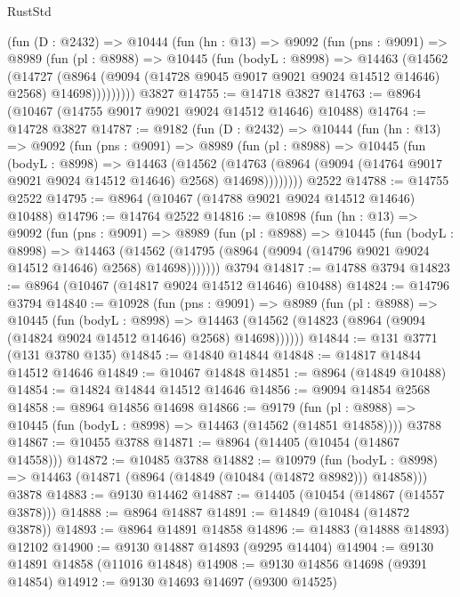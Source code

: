 \begin{lexlean}{RustStd}
\begin{coremodule}
      (fun (D : @2432) =>
      @10444
        (fun (hn : @13) =>
        @9092
          (fun (pns : @9091) =>
          @8989
            (fun (pl : @8988) =>
            @10445
              (fun (bodyL : @8998) =>
              @14463
                (@14562
                  (@14727
                    (@8964
                      (@9094 (@14728 @9045 @9017 @9021 @9024 @14512 @14646) @2568)
                      @14698)))))))))
    @3827
@14755 := @14718 @3827
@14763 := @8964 (@10467 (@14755 @9017 @9021 @9024 @14512 @14646) @10488)
@14764 := @14728 @3827
@14787 := @9182
    (fun (D : @2432) =>
    @10444
      (fun (hn : @13) =>
      @9092
        (fun (pns : @9091) =>
        @8989
          (fun (pl : @8988) =>
          @10445
            (fun (bodyL : @8998) =>
            @14463
              (@14562
                (@14763 (@8964 (@9094 (@14764 @9017 @9021 @9024 @14512 @14646) @2568) @14698))))))))
    @2522
@14788 := @14755 @2522
@14795 := @8964 (@10467 (@14788 @9021 @9024 @14512 @14646) @10488)
@14796 := @14764 @2522
@14816 := @10898
    (fun (hn : @13) =>
    @9092
      (fun (pns : @9091) =>
      @8989
        (fun (pl : @8988) =>
        @10445
          (fun (bodyL : @8998) =>
          @14463
            (@14562 (@14795 (@8964 (@9094 (@14796 @9021 @9024 @14512 @14646) @2568) @14698)))))))
    @3794
@14817 := @14788 @3794
@14823 := @8964 (@10467 (@14817 @9024 @14512 @14646) @10488)
@14824 := @14796 @3794
@14840 := @10928
    (fun (pns : @9091) =>
    @8989
      (fun (pl : @8988) =>
      @10445
        (fun (bodyL : @8998) =>
        @14463 (@14562 (@14823 (@8964 (@9094 (@14824 @9024 @14512 @14646) @2568) @14698))))))
@14844 := @131 @3771 (@131 @3780 @135)
@14845 := @14840 @14844
@14848 := @14817 @14844 @14512 @14646
@14849 := @10467 @14848
@14851 := @8964 (@14849 @10488)
@14854 := @14824 @14844 @14512 @14646
@14856 := @9094 @14854 @2568
@14858 := @8964 @14856 @14698
@14866 := @9179
    (fun (pl : @8988) => @10445 (fun (bodyL : @8998) => @14463 (@14562 (@14851 @14858))))
    @3788
@14867 := @10455 @3788
@14871 := @8964 (@14405 (@10454 (@14867 @14558)))
@14872 := @10485 @3788
@14882 := @10979
    (fun (bodyL : @8998) => @14463 (@14871 (@8964 (@14849 (@10484 (@14872 @8982))) @14858)))
    @3878
@14883 := @9130 @14462
@14887 := @14405 (@10454 (@14867 (@14557 @3878)))
@14888 := @8964 @14887
@14891 := @14849 (@10484 (@14872 @3878))
@14893 := @8964 @14891 @14858
@14896 := @14883 (@14888 @14893) @12102
@14900 := @9130 @14887 @14893 (@9295 @14404)
@14904 := @9130 @14891 @14858 (@11016 @14848)
@14908 := @9130 @14856 @14698 (@9391 @14854)
@14912 := @9130 @14693 @14697 (@9300 @14525)

\end{coremodule}
\end{lexlean}
